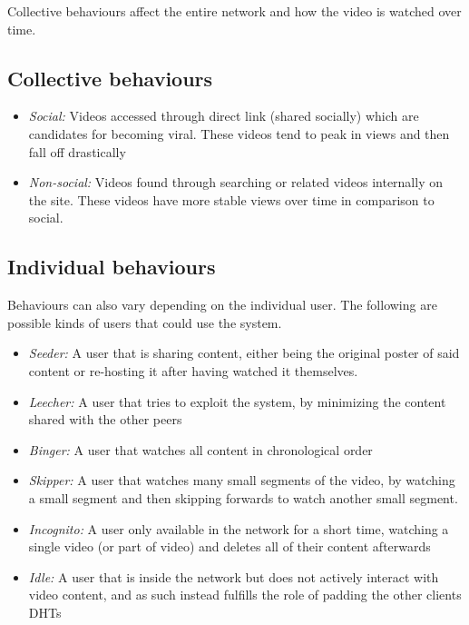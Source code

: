 Collective behaviours affect the entire network and how the video is watched over time.
\subsection{Collective behaviours}
\begin{itemize}
    \item \textit{Social:}
    Videos accessed through direct link (shared socially) which are candidates for becoming viral. These videos tend to peak in views and then fall off drastically
    \item \textit{Non-social:}
    Videos found through searching or related videos internally on the site. These videos have more stable views over time in comparison to social.
\end{itemize}

\subsection{Individual behaviours}
\label{sec:individual-behavious}
Behaviours can also vary depending on the individual user. The following are possible kinds of users that could use the system.
\begin{itemize}
    \item \textit{Seeder:}
    A user that is sharing content, either being the original poster of said content or re-hosting it after having watched it themselves.
    \item \textit{Leecher:}
    A user that tries to exploit the system, by minimizing the content shared with the other peers %
    \item \textit{Binger:}
    A user that watches all content in chronological order
    \item \textit{Skipper:}
    A user that watches many small segments of the video, by watching a small segment and then skipping forwards to watch another small segment.
    \item \textit{Incognito:}
    A user only available in the network for a short time, watching a single video (or part of video) and deletes all of their content afterwards
    \item \textit{Idle:}
    A user that is inside the network but does not actively interact with video content, and as such instead fulfills the role of padding the other clients \acp{DHT}
\end{itemize}


